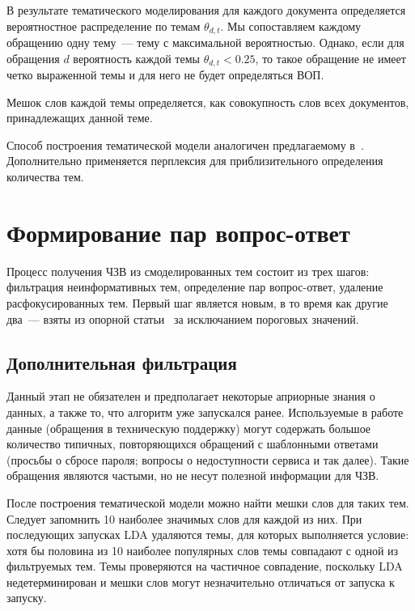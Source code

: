 В результате тематического моделирования для каждого документа определяется вероятностное распределение по темам $\theta_{d,t}$. Мы сопоставляем каждому обращению одну тему~--- тему с максимальной вероятностью. Однако, если для обращения $d$ вероятность каждой темы $\theta_{d,t}<0.25$, то такое обращение не имеет четко выраженной темы и для него не будет определяться ВОП.

Мешок слов каждой темы определяется, как совокупность слов всех документов, принадлежащих данной теме.

Способ построения тематической модели аналогичен предлагаемому в~\cite{original}. Дополнительно применяется перплексия для приблизительного определения количества тем.

\section{Формирование пар вопрос-ответ}
\label{sec:qaforming}

Процесс получения ЧЗВ из смоделированных тем состоит из трех шагов: фильтрация неинформативных тем, определение пар вопрос-ответ, удаление расфокусированных тем. Первый шаг является новым, в то время как другие два~--- взяты из опорной статьи~\cite{original} за исключанием пороговых значений.

\subsection{Дополнительная фильтрация}
\label{subsec:topicfilter}

Данный этап не обязателен и предполагает некоторые априорные знания о данных, а также то, что алгоритм уже запускался ранее. Используемые в работе данные (обращения в техническую поддержку) могут содержать большое количество типичных, повторяющихся обращений с шаблонными ответами (просьбы о сбросе пароля; вопросы о недоступности сервиса и так далее). Такие обращения являются частыми, но не несут полезной информации для ЧЗВ.

После построения тематической модели можно найти мешки слов для таких тем. Следует запомнить 10 наиболее значимых слов для каждой из них. При последующих запусках LDA удаляются темы, для которых выполняется условие: хотя бы половина из 10 наиболее популярных слов темы совпадают с одной из фильтруемых тем. Темы проверяются на частичное совпадение, поскольку LDA недетерминирован и мешки слов могут незначительно отличаться от запуска к запуску.

